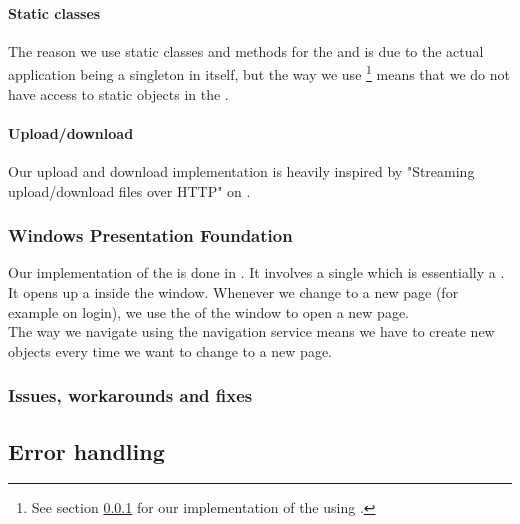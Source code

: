 \paragraph{Static classes}
The reason we use static classes and methods for the  and  is due to the actual application being a singleton in itself, but the way we use \footnote{See section \ref{Implementation_Client_Architecture_WPF} for our implementation of the  using .} means that we do not have access to static objects in the .

\paragraph{Upload/download} Our upload and download implementation is heavily inspired by "Streaming upload/download files over HTTP" on \cite{CODE:UPLDL}. 

\subsubsection{Windows Presentation Foundation}
\label{Implementation_Client_Architecture_WPF}
Our implementation of the  is done in . It involves a single  which is essentially a  . It opens up a  inside the window. Whenever we change to a new page (for example on login), we use the  of the window to open a new page.
\\The way we navigate using the navigation service means we have to create new  objects every time we want to change to a new page.

\subsubsection{Issues, workarounds and fixes}
\label{Implementation_Client_Architecture_Issues}

\subsection{Error handling}
\label{Implementation_Client_Error}

\class{}